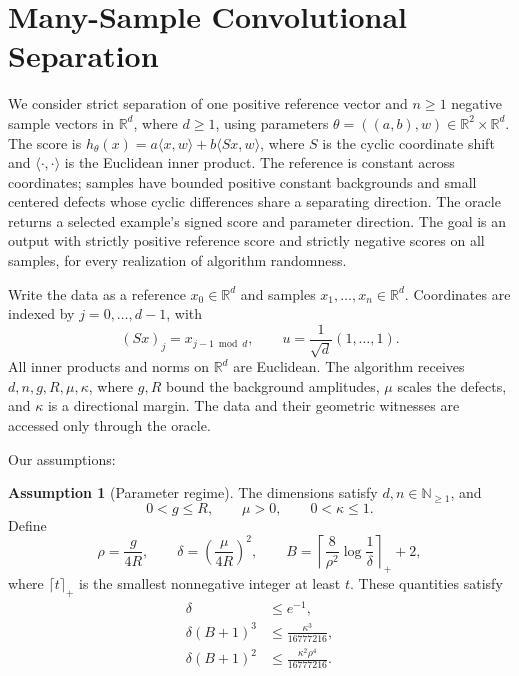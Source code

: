 \documentclass[10pt]{article}
\theoremstyle{definition}
\newtheorem{assumption}{Assumption}
\begin{document}
\section*{Many-Sample Convolutional Separation}
We consider strict separation of one positive reference vector and $n\geq1$ negative sample vectors in $\mathbb{R}^d$, where $d\geq1$, using parameters $\theta=((a,b),w)\in\mathbb{R}^2\times\mathbb{R}^d$. The score is $h_\theta(x)=a\langle x,w\rangle+b\langle Sx,w\rangle$, where $S$ is the cyclic coordinate shift and $\langle\cdot,\cdot\rangle$ is the Euclidean inner product. The reference is constant across coordinates; samples have bounded positive constant backgrounds and small centered defects whose cyclic differences share a separating direction. The oracle returns a selected example's signed score and parameter direction. The goal is an output with strictly positive reference score and strictly negative scores on all samples, for every realization of algorithm randomness.

Write the data as a reference $x_0\in\mathbb{R}^d$ and samples $x_1,\ldots,x_n\in\mathbb{R}^d$. Coordinates are indexed by $j=0,\ldots,d-1$, with
\[
(Sx)_j=x_{j-1\bmod d},
\qquad
u=\frac{1}{\sqrt d}(1,\ldots,1).
\]
All inner products and norms on $\mathbb{R}^d$ are Euclidean. The algorithm receives $d,n,g,R,\mu,\kappa$, where $g,R$ bound the background amplitudes, $\mu$ scales the defects, and $\kappa$ is a directional margin. The data and their geometric witnesses are accessed only through the oracle.

Our assumptions:
\begin{assumption}[Parameter regime]
The dimensions satisfy $d,n\in\mathbb{N}_{\geq1}$, and
\[
0<g\leq R,\qquad \mu>0,\qquad 0<\kappa\leq1.
\]
Define
\[
\rho=\frac{g}{4R},\qquad
\delta=\left(\frac{\mu}{4R}\right)^2,\qquad
B=\left\lceil\frac{8}{\rho^2}\log\frac{1}{\delta}\right\rceil_++2,
\]
where $\lceil t\rceil_+$ is the smallest nonnegative integer at least $t$. These quantities satisfy
\[
\begin{aligned}
\delta&\leq e^{-1},\\
\delta(B+1)^3&\leq\frac{\kappa^3}{16777216},\\
\delta(B+1)^2&\leq\frac{\kappa^2\rho^4}{16777216}.
\end{aligned}
\]
\end{assumption}
\end{document}
